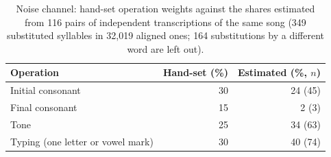 \begin{table}[t]
\centering\small
\caption{Noise channel: hand-set operation weights against the shares estimated from 116 pairs of
independent transcriptions of the same song (349 substituted syllables in
32,019 aligned ones; 164 substitutions by a different word are left out).}
\label{tab:channel}
\begin{tabular}{lrr}
\toprule
Operation & Hand-set (\%) & Estimated (\%, $n$) \\
\midrule
Initial consonant & 30 & 24 (45) \\
Final consonant & 15 & 2 (3) \\
Tone & 25 & 34 (63) \\
Typing (one letter or vowel mark) & 30 & 40 (74) \\
\bottomrule
\end{tabular}
\end{table}
